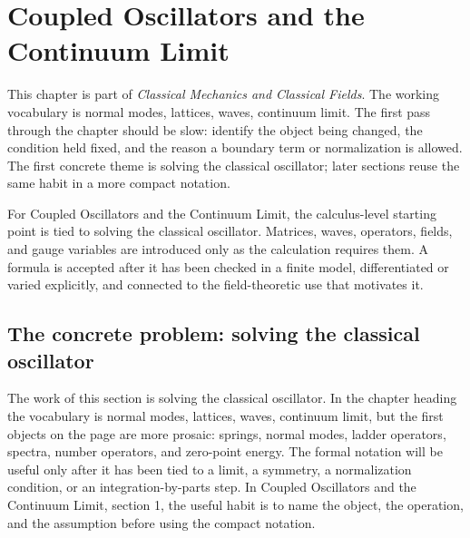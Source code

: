 \chapter{Coupled Oscillators and the Continuum Limit}


This chapter is part of \emph{Classical Mechanics and Classical Fields}.  The working vocabulary is normal modes, lattices, waves, continuum limit.  The first pass through the chapter should be slow: identify the object being changed, the condition held fixed, and the reason a boundary term or normalization is allowed.  The first concrete theme is solving the classical oscillator; later sections reuse the same habit in a more compact notation.

For Coupled Oscillators and the Continuum Limit, the calculus-level starting point is tied to solving the classical oscillator.  Matrices, waves, operators, fields, and gauge variables are introduced only as the calculation requires them.  A formula is accepted after it has been checked in a finite model, differentiated or varied explicitly, and connected to the field-theoretic use that motivates it.

\section{The concrete problem: solving the classical oscillator}













The work of this section is solving the classical oscillator.  In the chapter heading the vocabulary is normal modes, lattices, waves, continuum limit, but the first objects on the page are more prosaic: springs, normal modes, ladder operators, spectra, number operators, and zero-point energy.  The formal notation will be useful only after it has been tied to a limit, a symmetry, a normalization condition, or an integration-by-parts step.  In Coupled Oscillators and the Continuum Limit, section 1, the useful habit is to name the object, the operation, and the assumption before using the compact notation.

